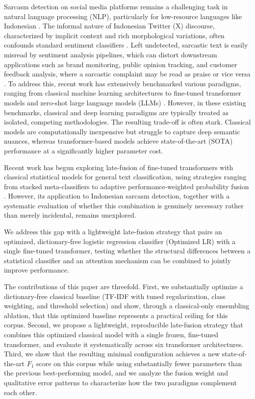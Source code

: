 \documentclass[conference]{IEEEtran}
\begin{document}
Sarcasm detection on social media platforms remains a challenging task in natural language processing (NLP), particularly for low-resource languages like Indonesian \cite{Khan2024An}. The informal nature of Indonesian Twitter (X) discourse, characterized by implicit context and rich morphological variations, often confounds standard sentiment classifiers \cite{joshi2017}. Left undetected, sarcastic text is easily misread by sentiment analysis pipelines, which can distort downstream applications such as brand monitoring, public opinion tracking, and customer feedback analysis, where a sarcastic complaint may be read as praise or vice versa \cite{maynard2014}. To address this, recent work has extensively benchmarked various paradigms, ranging from classical machine learning architectures to fine-tuned transformer models and zero-shot large language models (LLMs) \cite{idsarcasm}. However, in these existing benchmarks, classical and deep learning paradigms are typically treated as isolated, competing methodologies. The resulting trade-off is often stark. Classical models are computationally inexpensive but struggle to capture deep semantic nuances, whereas transformer-based models achieve state-of-the-art (SOTA) performance at a significantly higher parameter cost.

Recent work has begun exploring late-fusion of fine-tuned transformers with classical statistical models for general text classification, using strategies ranging from stacked meta-classifiers to adaptive performance-weighted probability fusion \cite{ramya2026hybrid, golestani2026lightweight}. However, its application to Indonesian sarcasm detection, together with a systematic evaluation of whether this combination is genuinely necessary rather than merely incidental, remains unexplored.

We address this gap with a lightweight late-fusion strategy that pairs an optimized, dictionary-free logistic regression classifier (Optimized LR) with a single fine-tuned transformer, testing whether the structural differences between a statistical classifier and an attention mechanism can be combined to jointly improve performance.

The contributions of this paper are threefold. First, we substantially optimize a dictionary-free classical baseline (TF-IDF with tuned regularization, class weighting, and threshold selection) and show, through a classical-only ensembling ablation, that this optimized baseline represents a practical ceiling for this corpus. Second, we propose a lightweight, reproducible late-fusion strategy that combines this optimized classical model with a single frozen, fine-tuned transformer, and evaluate it systematically across six transformer architectures. Third, we show that the resulting minimal configuration achieves a new state-of-the-art $F_1$ score on this corpus while using substantially fewer parameters than the previous best-performing model, and we analyze the fusion weight and qualitative error patterns to characterize how the two paradigms complement each other.
\end{document}
